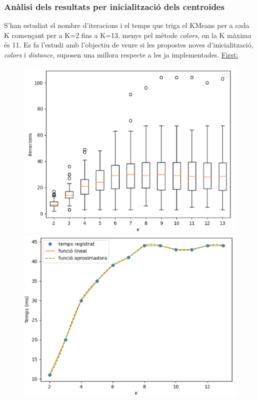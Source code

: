 \documentclass[a4paper, 11pt]{article}
\begin{document}
\subsubsection{Anàlisi dels resultats per inicialització dels centroides}
S'han estudiat el nombre d'iteracions i el temps que triga el KMeans per a cada K començant per a K=2 fins a K=13, menys pel mètode \textit{colors}, on la K màxima és 11. Es fa l'estudi amb l'objectiu de veure si les propostes noves d'inicialització, \textit{colors} i \textit{distance}, suposen una millora respecte a les ja implementades.
\center\underline{First:}
\begin{figure}[h!]
\centering
\begin{minipage}{.5\textwidth}
  \centering
  \includegraphics[width=.8\linewidth]{boxplot_default_centroides.PNG}
\end{minipage}%
\begin{minipage}{.5\textwidth}
  \centering
  \includegraphics[width=.8\linewidth]{temps_default_centroides.PNG}
\end{minipage}
\end{figure}
\end{document}
